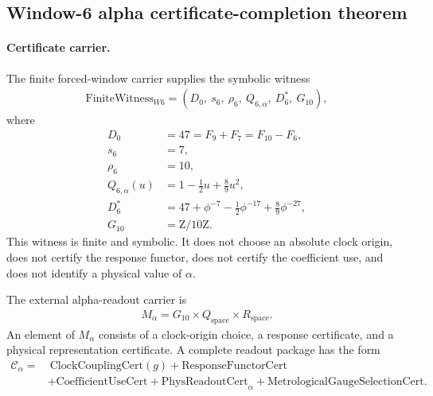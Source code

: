 
\subsection{Window-6 alpha certificate-completion theorem}
\label{sec:window6-alpha-certificate-completion-theorem}

\paragraph{Certificate carrier.}
The finite forced-window carrier supplies the symbolic witness
$$
\begin{aligned}
\mathrm{FiniteWitness}_{W6}
=
\left(
D_0,\ s_6,\ \rho_6,\ Q_{6,\alpha},\ D_6^{*},\ G_{10}
\right),
\end{aligned}
$$
where
$$
\begin{aligned}
D_0&=47=F_9+F_7=F_{10}-F_6,\\
s_6&=7,\\
\rho_6&=10,\\
Q_{6,\alpha}(u)&=1-\frac{1}{2}u+\frac{8}{9}u^2,\\
D_6^{*}&=47+\phi^{-7}-\frac{1}{2}\phi^{-17}+\frac{8}{9}\phi^{-27},\\
G_{10}&=\mathrm{Z}/10\mathrm{Z}.
\end{aligned}
$$
This witness is finite and symbolic.  It does not choose an absolute clock origin, does not certify the response functor, does not certify the coefficient use, and does not identify a physical value of $\alpha$.

The external alpha-readout carrier is
$$
\begin{aligned}
M_{\alpha}=G_{10}\times Q_{\mathrm{space}}\times R_{\mathrm{space}}.
\end{aligned}
$$
An element of $M_{\alpha}$ consists of a clock-origin choice, a response certificate, and a physical representation certificate.  A complete readout package has the form
$$
\begin{aligned}
\mathcal{C}_{\alpha}
=&
\ \mathrm{ClockCouplingCert}(g)
+\mathrm{ResponseFunctorCert}\\
&+\mathrm{CoefficientUseCert}
+\mathrm{PhysReadoutCert}_{\alpha}
+\mathrm{MetrologicalGaugeSelectionCert}.
\end{aligned}
$$

